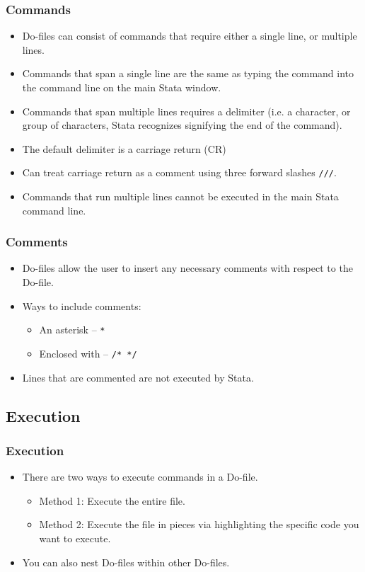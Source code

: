 \documentclass{beamer}
\begin{document}
\begin{frame}
	\frametitle{Commands}
		\begin{itemize}
			\item Do-files can consist of commands that require either a single line, or multiple lines.
			\item Commands that span a single line are the same as typing the command into the command line on the main Stata window.
			\item Commands that span multiple lines requires a delimiter (i.e. a character, or group of characters, Stata recognizes signifying the end of the command).
			\item The default delimiter is a carriage return (CR)
			\item Can treat carriage return as a comment using three forward slashes \texttt{///}.
			\item Commands that run multiple lines cannot be executed in the main Stata command line.
		\end{itemize}
\end{frame}

\begin{frame}
	\frametitle{Comments}
		\begin{itemize}
			\item Do-files allow the user to insert any necessary comments with respect to the Do-file.
			\item Ways to include comments:
				\begin{itemize}
					\item An asterisk -- \texttt{*}
					\item Enclosed with -- \texttt{/* */}
				\end{itemize}
			\item Lines that are commented are not executed by Stata.
		\end{itemize}
\end{frame}

\subsection{Execution}

\begin{frame}
	\frametitle{Execution}
		\begin{itemize}
		\item There are two ways to execute commands in a Do-file.
			\begin{itemize}
				\item Method 1: Execute the entire file.
				\item Method 2: Execute the file in pieces via highlighting the specific code you want to execute.
			\end{itemize}
		\item You can also nest Do-files within other Do-files.
		\end{itemize}
\end{frame}
\end{document}
